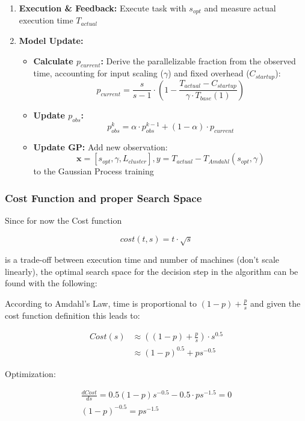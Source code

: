 \documentclass[a4paper, 12pt]{article}
\begin{document}
\begin{enumerate}
		\item \textbf{Execution \& Feedback:} Execute task with $s_{opt}$ and measure actual execution time $T_{actual}$
		\item \textbf{Model Update:} 
		\begin{itemize}
			\item \textbf{Calculate $p_{current}$:}
			Derive the parallelizable fraction from the observed time, accounting for input scaling ($\gamma$) and fixed overhead ($C_{startup}$):
			\[
			p_{current} = \frac{s}{s-1} \cdot \left(1 - \frac{T_{actual} - C_{startup}}{\gamma \cdot T_{base}(1)}\right)
			\]
			\item \textbf{Update $p_{obs}$:}
			\[
			p_{obs}^{k} = \alpha \cdot p_{obs}^{k-1} + (1 - \alpha) \cdot p_{current}
			\]
			\item \textbf{Update GP:} Add new observation:
			\[
			\mathbf{x} = \left[s_{opt}, \gamma, L_{cluster}\right], y = T_{actual} - T_{Amdahl}(s_{opt}, \gamma)
			\]
			to the Gaussian Process training
		\end{itemize}
	\end{enumerate}
	
	\subsubsection*{Cost Function and proper Search Space}
	Since for now the Cost function
	
	\[
	cost(t, s) = t \cdot \sqrt{s}
	\]
	
	 is a trade-off between execution time and number of machines (don't scale linearly), the optimal search space for the decision step in the algorithm can be found with the following:
	 
	 According to Amdahl's Law, time is proportional to $(1-p) + \frac{p}{s}$ and given the cost function definition this leads to:
	 
	 \begin{align*}
	 	Cost(s) &\approx \left((1-p) + \frac{p}{s}\right) \cdot s^{0.5} \\[7pt]
	 	&\approx (1-p)^{0.5} + ps^{-0.5}
	 \end{align*}
	 
	 Optimization:
	 
	 \begin{align*}
	 	\frac{dCost}{ds} = 0.5(1-p)s^{-0.5} - 0.5 \cdot ps^{-1.5} = 0 \\[7pt]
	 	(1-p)^{-0.5} = ps^{-1.5}
	 \end{align*}
	 
\end{document}
